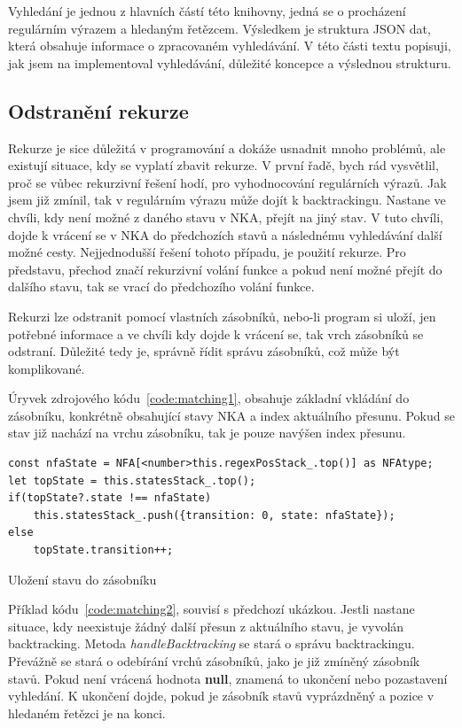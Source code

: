 Vyhledání je jednou z hlavních částí této knihovny, jedná se o procházení regulárním výrazem a hledaným řetězcem.
Výsledkem je struktura JSON dat, která obsahuje informace o zpracovaném vyhledávání.
V této části textu popisuji, jak jsem na implementoval vyhledávání, důležité koncepce a výslednou strukturu.

\subsection*{Odstranění rekurze}

Rekurze je sice důležitá v programování a dokáže usnadnit mnoho problémů, ale existují situace, kdy se vyplatí zbavit rekurze.
V první řadě, bych rád vysvětlil, proč se vůbec rekurzivní řešení hodí, pro vyhodnocování regulárních výrazů.
Jak jsem již zmínil, tak v regulárním výrazu může dojít k backtrackingu.
Nastane ve chvíli, kdy není možné z daného stavu v NKA, přejít na jiný stav.
V tuto chvíli, dojde k vrácení se v NKA do předchozích stavů a následnému vyhledávání další možné cesty.
Nejjednodušší řešení tohoto případu, je použití rekurze.
Pro představu, přechod značí rekurzivní volání funkce a pokud není možné přejít do dalšího stavu, tak se vrací do předchozího volání funkce.

Rekurzi lze odstranit pomocí vlastních zásobníků, nebo-li program si uloží, jen potřebné informace a ve chvíli kdy dojde k vrácení se, tak vrch zásobníků se odstraní.
Důležité tedy je, správně řídit správu zásobníků, což může být komplikované.

Úryvek zdrojového kódu~\ref{code:matching1}, obsahuje základní vkládání do zásobníku, konkrétně obsahující stavy NKA a index aktuálního přesunu.
Pokud se stav již nachází na vrchu zásobníku, tak je pouze navýšen index přesunu.

\begin{code}[!ht]
	\begin{verbatim}
const nfaState = NFA[<number>this.regexPosStack_.top()] as NFAtype;
let topState = this.statesStack_.top();
if(topState?.state !== nfaState)
	this.statesStack_.push({transition: 0, state: nfaState});
else
	topState.transition++;
	\end{verbatim}
	\caption{Uložení stavu do zásobníku}
	\label{code:matching1}
\end{code}

Příklad kódu~\ref{code:matching2}, souvisí s předchozí ukázkou. 
Jestli nastane situace, kdy neexistuje žádný další přesun z aktuálního stavu, je vyvolán backtracking.
Metoda \textit{handleBacktracking} se stará o správu backtrackingu.
Převážně se stará o odebírání vrchů zásobníků, jako je již zmíněný zásobník stavů.
Pokud není vrácená hodnota \textbf{null}, znamená to ukončení nebo pozastavení vyhledání.
K ukončení dojde, pokud je zásobník stavů vyprázdněný a pozice v hledaném řetězci je na konci.

